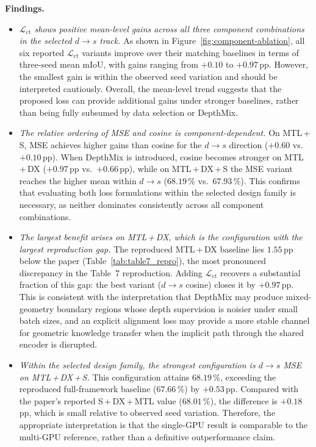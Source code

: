 \vspace{4pt}
\noindent
\textbf{Findings.}
\begin{itemize}

\item \textit{$\mathcal{L}_\text{ct}$ shows positive mean-level gains
  across all three component combinations in the selected
  $d{\rightarrow}s$ track.}
  As shown in Figure~\ref{fig:component-ablation}, all six reported
  $\mathcal{L}_\text{ct}$ variants improve over their matching baselines
  in terms of three-seed mean mIoU, with gains ranging from $+0.10$ to
  $+0.97$\,pp. However, the smallest gain is within the observed seed
  variation and should be interpreted cautiously. Overall, the mean-level
  trend suggests that the proposed loss can provide additional gains under
  stronger baselines, rather than being fully subsumed by data selection
  or DepthMix.

\item \textit{The relative ordering of MSE and cosine is
  component-dependent.}
  On MTL\,+\,S, MSE achieves higher gains than cosine for the
  $d{\rightarrow}s$ direction ($+0.60$ vs.\ $+0.10$\,pp). When
  DepthMix is introduced, cosine becomes stronger on MTL\,+\,DX
  ($+0.97$\,pp vs.\ $+0.66$\,pp), while on MTL\,+\,DX\,+\,S the MSE
  variant reaches the higher mean within $d{\rightarrow}s$
  ($68.19$\,\% vs.\ $67.93$\,\%). This confirms that evaluating both
  loss formulations within the selected design family is necessary, as
  neither dominates consistently across all component combinations.

\item \textit{The largest benefit arises on MTL\,+\,DX, which is the
  configuration with the largest reproduction gap.}
  The reproduced MTL\,+\,DX baseline lies $1.55$\,pp below the paper
  (Table~\ref{tab:table7_repro}), the most pronounced discrepancy in
  the Table~7 reproduction. Adding $\mathcal{L}_\text{ct}$ recovers a
  substantial fraction of this gap: the best variant
  ($d{\rightarrow}s$ cosine) closes it by $+0.97$\,pp. This is
  consistent with the interpretation that DepthMix may produce
  mixed-geometry boundary regions whose depth supervision is noisier
  under small batch sizes, and an explicit alignment loss may provide a
  more stable channel for geometric knowledge transfer when the
  implicit path through the shared encoder is disrupted.

\item \textit{Within the selected design family, the strongest
  configuration is $d{\rightarrow}s$ MSE on MTL\,+\,DX\,+\,S.}
  This configuration attains $68.19$\,\%, exceeding the reproduced
  full-framework baseline ($67.66$\,\%) by $+0.53$\,pp. Compared with the
  paper's reported S\,+\,DX\,+\,MTL value ($68.01$\,\%), the difference is
  $+0.18$\,pp, which is small relative to observed seed variation.
  Therefore, the appropriate interpretation is that the single-GPU result
  is comparable to the multi-GPU reference, rather than a definitive
  outperformance claim.

\end{itemize}

